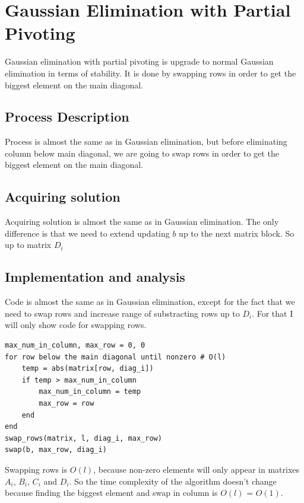 \documentclass[11pt]{article}
\begin{document}
\section{Gaussian Elimination with Partial Pivoting}
Gaussian elimination with partial pivoting is upgrade to normal Gaussian elimination in terms of stability.
It is done by swapping rows in order to get the biggest element on the main diagonal.

\subsection*{Process Description}
Process is almost the same as in Gaussian elimination, but before eliminating column below main diagonal,
we are going to swap rows in order to get the biggest element on the main diagonal.
\subsection*{Acquiring solution}
Acquiring solution is almost the same as in Gaussian elimination. 
The only difference is that we need to extend updating $b$ up to the next matrix block. So up to matrix $D_i$
\subsection*{Implementation and analysis} 
Code is almost the same as in Gaussian elimination, except for the fact that we need to swap rows and increase range of substracting rows up to $D_i$.
For that I will only show code for swapping rows.
\begin{lstlisting}
max_num_in_column, max_row = 0, 0 
for row below the main diagonal until nonzero # O(l)
    temp = abs(matrix[row, diag_i])
    if temp > max_num_in_column
        max_num_in_column = temp
        max_row = row
    end
end
swap_rows(matrix, l, diag_i, max_row)
swap(b, max_row, diag_i)
\end{lstlisting}
Swapping rows is $O(l)$, because non-zero elements will only appear in matrixes $A_i$, $B_i$, $C_i$ and $D_i$.
So the time complexity of the algorithm doesn't change because finding the biggest element and swap in column is $O(l)$ = $O(1)$.
\end{document}
